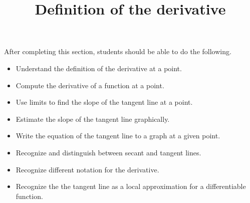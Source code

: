 \documentclass{ximera}
\title{Definition of the derivative}
\begin{document}
\begin{abstract}
\end{abstract}

\maketitle

\begin{sectionOutcomes}

After completing this section, students should be able to do the following.

\begin{itemize}
\item Understand the definition of the derivative at a point.
\item Compute the derivative of a function at a point.
\item Use limits to find the slope of the tangent line at a point.
\item Estimate the slope of the tangent line graphically.
\item Write the equation of the tangent line to a graph at a given point.
\item Recognize and distinguish between secant and tangent lines.
\item Recognize different notation for the derivative.
\item Recognize the the tangent line as a local approximation for a
  differentiable function.
\end{itemize}

\end{sectionOutcomes}
\end{document}
